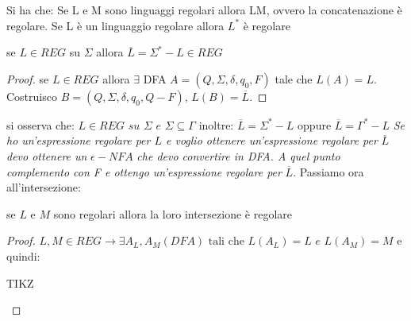 \begin{theorem}
	Si ha che:
	Se L e M sono linguaggi regolari allora LM, ovvero la concatenazione è regolare.
	Se L è un linguaggio regolare allora $L^*$ è regolare
\end{theorem}
\begin{theorem}
	se $L\in REG$ su $\Sigma$ allora $\overline{L}=\Sigma^*-L\in REG$
\end{theorem}
\begin{proof}
	se $L\in REG$ allora $\exists$ DFA $A=(Q, \Sigma, \delta, q_0, F)$ tale che $L(A)=L$. Costruisco $B=(Q,\Sigma, \delta,q_0, Q-F),\,   L(B)=\overline{L}$.
\end{proof}
si osserva che:
$L\in REG\,\,su\,\, \Sigma\,\,e\,\, \Sigma\subseteq \Gamma$
inoltre:
$\overline{L}=\Sigma^*-L$ oppure $\overline{L}=\Gamma^*-L$
\textit{Se ho un'espressione regolare per $L$ e voglio ottenere un'espressione regolare per }$\overline{L}$\textit{ devo ottenere un }$\epsilon-NFA$\textit{ che devo convertire in DFA. A quel punto complemento con F e ottengo un'espressione regolare per }$\overline{L}$.
Passiamo ora all'intersezione:
\begin{theorem}
	se $L$ e $M$ sono regolari allora la loro intersezione è regolare
\end{theorem}
\begin{proof}
	$L,M\in REG\to \exists A_L,A_M(DFA) \text{ tali che }L(A_L)=L\,\,e\,\, L(A_M)=M$
	e quindi:
	\begin{center}
		TIKZ
	\end{center}
\end{proof}
